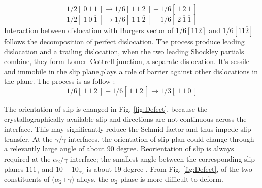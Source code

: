 \documentclass[metals,article,submit,moreauthors,pdftex,10pt,a4paper]{Definitions/mdpi}
\begin{document}

\begin{equation}\label{eq:dis-1}
1/2 [\ 0\ 1\ 1\ ] \to 1/6[\ 1\ 1\ 2\ ]+1/6[\ \overline{1}\ 2\ 1\ ]
\end{equation}
\begin{equation}\label{eq:dis-2}
1/2 [\ 1\ 0\ \overline{1}\ ] \to 1/6 [\ 1\ 1\ \overline{2}\ ] + 1/6[\ 2\ \overline{1}\ \overline{1}\ ]
\end{equation}
Interaction between dislocation with Burgers vector of $1/6 [112] $ and $ 1/6 [11\overline{2}]$ follows the decomposition of perfect dislocation. The process produce leading dislocation and a trailing dislocation, when the two leading Shockley partials combine, they form Lomer–Cottrell junction, a separate dislocation. It's sessile and immobile in the slip plane,plays a role of barrier against other dislocations in the plane. The process is as follow :
\begin{equation}\label{eq:dis-3}
1/6 [\ 1\ 1\ 2\ ] + 1/6 [\ 1\ 1\  \overline{2}\ ] \to 1/3 [\ 1\ 1\ 0\ ]
\end{equation}


The orientation of slip is changed in Fig. \ref{fig:Defect}, because the crystallographically available slip and directions are not continuous across the interface. This may significantly reduce the Schmid factor and thus impede slip transfer. At the $\gamma/\gamma$ interfaces, the orientation of slip plan could change through a relevantly large angle of about 90 degree. Reorientation of slip is always required at the $\alpha_{2}/\gamma$ interface; the smallest angle between the corresponding slip planes ${1 1 1}_{\gamma}$ and ${ 1 0 -1 0}_{\alpha_2}$ is about 19 degree \cite{intro-structure}. From Fig. \ref{fig:Defect}, of the two constituents of ($\alpha_2$+$\gamma$) alloys, the $\alpha_2$ phase is more difficult to deform. 
\end{document}

